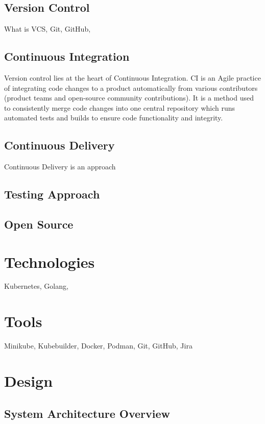 \documentclass{article}
\begin{document}
\subsection{Version Control}
What is VCS, Git, GitHub, 


\subsection{Continuous Integration}
Version control lies at the heart of Continuous Integration. CI is an Agile practice of 
integrating code changes to a product automatically from various contributors (product 
teams and open-source community contributions). It is a method used to consistently merge 
code changes into one central repository which runs automated tests and builds to ensure 
code functionality and integrity.   



\subsection{Continuous Delivery}
Continuous Delivery is an approach 


\subsection{Testing Approach}



\subsection{Open Source}



\section{Technologies}
Kubernetes, Golang, 


\section{Tools}
Minikube, Kubebuilder, Docker, Podman, Git, GitHub, Jira


\section{Design}



\subsection{System Architecture Overview}
\end{document}
